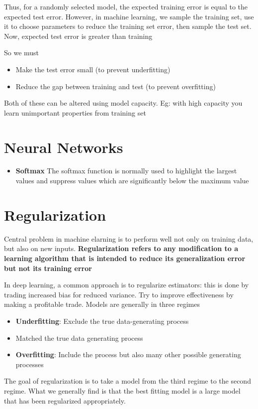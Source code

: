 \documentclass{article}
\theoremstyle{definition}
\begin{document}
Thus, for a randomly selected model, the expected training error is equal to the expected test error. However, in machine learning, we sample the training set, use it to choose parameters to reduce the training set error, then sample the test set. Now, expected test error is greater than training

So we must 
\begin{itemize}
    \item Make the test error small (to prevent underfitting)
    \item Reduce the gap between training and test (to prevent overfitting)
\end{itemize}

Both of these can be altered using model capacity. Eg: with high capacity you learn unimportant properties from training set

\section{Neural Networks}

\begin{itemize}
    \item \textbf{Softmax} The softmax function is normally used to highlight the largest values and suppress values which are significantly below the maximum value
\end{itemize}

\section{Regularization}
Central problem in machine elarning is to perform well not only on training data, but also on new inputs. \textbf{Regularization refers to any modification to a learning algorithm that is intended to reduce its generalization error but not its training error}

In deep learning, a common approach is to regularize estimators: this is done by trading increased bias for reduced variance. Try to improve effectiveness by making a profitable trade. Models are generally in three regimes
\begin{itemize}
    \item \textbf{Underfitting}: Exclude the true data-generating process
    \item Matched the true data generating process
    \item \textbf{Overfitting}: Include the process but also many other possible generating processes
\end{itemize}
The goal of regularization is to take a model from the third regime to the second regime. What we generally find is that the best fitting model is a large model that has been regularized appropriately.
\end{document}
